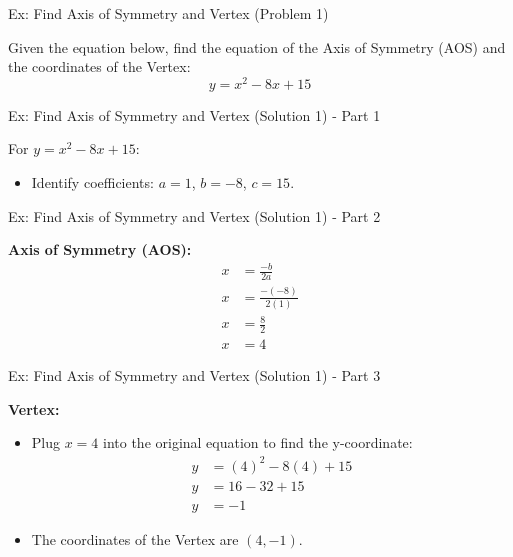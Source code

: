 \documentclass[aspectratio=169]{beamer}
\begin{document}
\begin{frame}{Ex: Find Axis of Symmetry and Vertex (Problem 1)}
    \begin{tcolorbox}[colback=lightgray,colframe=primary,title=Problem 1]
        \footnotesize
        Given the equation below, find the equation of the Axis of Symmetry (AOS) and the coordinates of the Vertex:\\
        \[ y = x^2 - 8x + 15 \]
    \end{tcolorbox}
\end{frame}

\begin{frame}{Ex: Find Axis of Symmetry and Vertex (Solution 1) - Part 1}
    \begin{tcolorbox}[colback=lightgray,colframe=accent,title=Solution 1: Identify Coefficients]
        \footnotesize
        For $y = x^2 - 8x + 15$:
        \begin{itemize}
            \item Identify coefficients: $a=1$, $b=-8$, $c=15$.
        \end{itemize}
    \end{tcolorbox}
\end{frame}

\begin{frame}{Ex: Find Axis of Symmetry and Vertex (Solution 1) - Part 2}
    \begin{tcolorbox}[colback=lightgray,colframe=accent,title=Solution 1: Axis of Symmetry (AOS)]
        \footnotesize
        \textbf{Axis of Symmetry (AOS):}
        \begin{align*}
            x &= \frac{-b}{2a} \\
            x &= \frac{-(-8)}{2(1)} \\
            x &= \frac{8}{2} \\
            x &= 4
        \end{align*}
    \end{tcolorbox}
\end{frame}

\begin{frame}{Ex: Find Axis of Symmetry and Vertex (Solution 1) - Part 3}
    \begin{tcolorbox}[colback=lightgray,colframe=accent,title=Solution 1: Vertex Coordinates]
        \footnotesize
        \textbf{Vertex:}
        \begin{itemize}
            \item Plug $x=4$ into the original equation to find the y-coordinate:
                \begin{align*}
                    y &= (4)^2 - 8(4) + 15 \\
                    y &= 16 - 32 + 15 \\
                    y &= -1
                \end{align*}
            \item The coordinates of the Vertex are $(4, -1)$.
        \end{itemize}
    \end{tcolorbox}
\end{frame}
\end{document}
